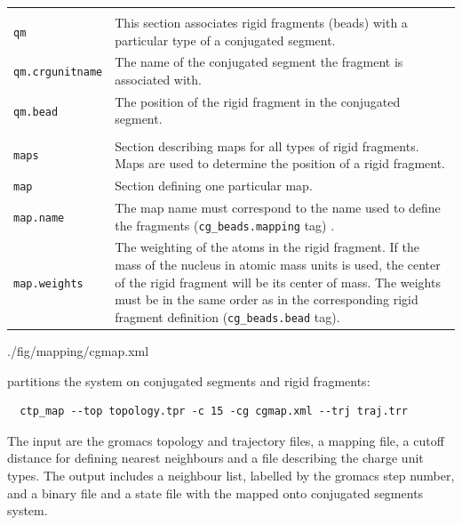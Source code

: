 {\begin{tabular}{p{3cm} p{10cm}}
& \\
\texttt{qm} & This section associates rigid fragments (beads) with a particular type of a conjugated segment. \\
%
\texttt{qm.crgunitname} &  The name of the conjugated segment the fragment is associated with. \\
%
\texttt{qm.bead} & The position of the rigid fragment in the conjugated segment. \\
& \\
\texttt{maps} & Section describing maps for all types of rigid fragments. Maps are used to determine the position of a rigid fragment. \\
%
\texttt{map} &  Section defining one particular map. \\
%
\texttt{map.name} & The map name must correspond to the name used to define the fragments (\texttt{cg\_beads.mapping} tag) . \\
%
\texttt{map.weights} & The weighting of the atoms in the rigid fragment. If the mass of the nucleus in atomic mass units is used, the center of the rigid fragment will be its center of mass. The weights must be in the same order as in the corresponding rigid fragment definition (\texttt{cg\_beads.bead} tag).
\end{tabular}
}

\clearpage



%
{./fig/mapping/cgmap.xml}



\ctpmap partitions the system on conjugated segments and rigid fragments:
\begin{verbatim}
  ctp_map --top topology.tpr -c 15 -cg cgmap.xml --trj traj.trr
\end{verbatim}
The input are the gromacs topology and trajectory files, a mapping file, a cutoff distance for defining nearest neighbours and a file describing the charge unit types. The output includes a neighbour list, labelled by the gromacs step number, and a binary 
file and a state file with the mapped onto conjugated segments system. 

